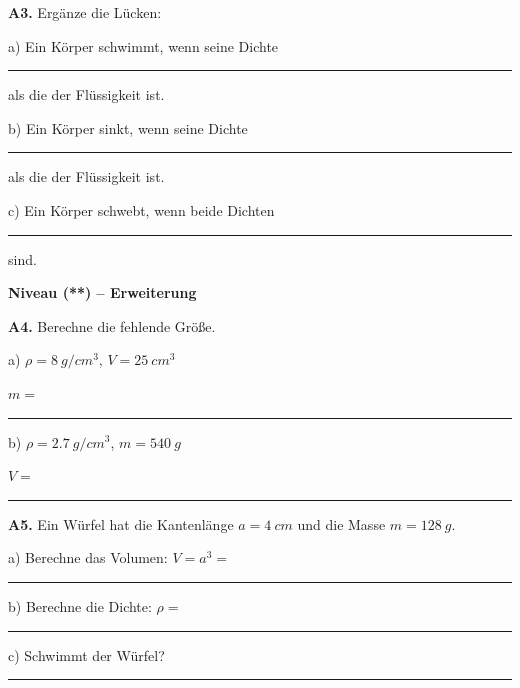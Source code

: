 \documentclass[10pt, a4paper]{article}
\newcommand{\fachfarbe}{physik}
\newcommand{\luecke}[1]{\rule{#1}{0.4pt}}
\newcommand{\abschnitt}[1]{%
    \vspace{6pt}
    \noindent\textbf{\textcolor{\fachfarbe}{#1}}
    \vspace{3pt}
}
\begin{document}
\begin{multicols}{2}
\textbf{A3.} Ergänze die Lücken:

\vspace{3pt}

a) Ein Körper schwimmt, wenn seine Dichte

\luecke{1.5cm} als die der Flüssigkeit ist.

\vspace{4pt}

b) Ein Körper sinkt, wenn seine Dichte

\luecke{1.5cm} als die der Flüssigkeit ist.

\vspace{4pt}

c) Ein Körper schwebt, wenn beide Dichten

\luecke{1.5cm} sind.

\vspace{10pt}


\abschnitt{Niveau (**) -- Erweiterung}

\textbf{A4.} Berechne die fehlende Größe.

\vspace{3pt}

a) $\rho = \SI{8}{g/cm^3}$, $V = \SI{25}{cm^3}$

\vspace{2pt}
$m = $ \luecke{3cm}

\vspace{5pt}

b) $\rho = \SI{2,7}{g/cm^3}$, $m = \SI{540}{g}$

\vspace{2pt}
$V = $ \luecke{3cm}

\vspace{8pt}

\textbf{A5.} Ein Würfel hat die Kantenlänge $a = \SI{4}{cm}$ und die Masse $m = \SI{128}{g}$.

\vspace{3pt}

a) Berechne das Volumen: $V = a^3 = $ \luecke{2cm}

\vspace{4pt}

b) Berechne die Dichte: $\rho = $ \luecke{2cm}

\vspace{4pt}

c) Schwimmt der Würfel? \luecke{2.5cm}


\end{multicols}
\end{document}

